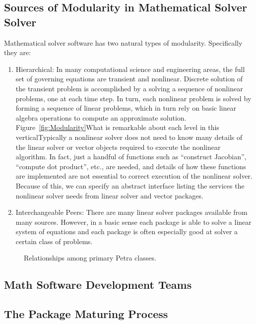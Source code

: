 \documentclass[12pt,relax]{TPA}
\begin{document}
\subsection{Sources of Modularity in Mathematical Solver Solver}

Mathematical solver software has two natural types of modularity.
Specifically they are:
\begin{enumerate}
\item Hierarchical: In many computational science and engineering
areas, the full set of governing equations are transient and
nonlinear.  Discrete solution of the transient problem is accomplished
by a solving a sequence of nonlinear problems, one at each time step.
In turn, each nonlinear problem is solved by forming a sequence of
linear problems, which in turn rely on basic linear algebra operations
to compute an approximate solution.  Figure~\ref{fig:Modularity}What is remarkable about each
level in this verticalTypically a nonlinear solver does
not need to know many details of the linear solver or vector objects
required to execute the nonlinear algorithm.  In fact, just a handful
of functions such as ``construct Jacobian'', ``compute dot product'',
etc., are needed, and details of how these functions are implemented
are not essential to correct execution of the nonlinear solver.
Because of this, we can specify an abstract interface listing the
services the nonlinear solver needs from linear solver and vector packages.
\item Interchangeable Peers: There are many linear solver packages
available from many sources.  However, in a basic sense each package
is able to solve a linear system of equations and each package is
often especially good at solver a certain class of problems.
\end{enumerate}
\begin{figure}[ht]
\begin{center}
\caption{Relationships among primary Petra classes.}
\label{matvecmap}
\end{center}
\end{figure}
\subsection{Math Software Development Teams}

\subsection{The Package Maturing Process}
\end{document}
